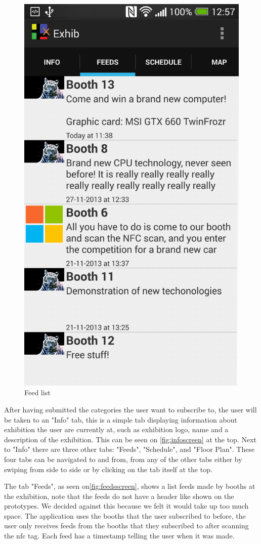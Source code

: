 \begin{figure}[H]
\begin{minipage}[b]{0.5\columnwidth}
\includegraphics[width=0.7\columnwidth]{img/finaldesign/feedsscreen.png}
\caption{Feed list} 
\label{fig:feedsscreen}
\end{minipage}
\end{figure}

After having submitted the categories the user want to subscribe to, the user will be taken to an "Info" tab, this is a simple tab displaying information about exhibition the user are currently at, such as exhibition logo, name and a description of the exhibition. This can be seen on \autoref{fig:infoscreen}  at the top. Next to "Info" there are three other tabs: "Feeds", "Schedule", and "Floor Plan". These four tabs can be navigated to and from, from any of the other tabs either by swiping from side to side or by clicking on the tab itself at the top.

The tab "Feeds", as seen on\autoref{fig:feedsscreen}, shows a list feeds made by booths at the exhibition, note that the feeds do not have a header like shown on the prototypes. We decided against this because we felt it would take up too much space. The application uses the booths that the user subscribed to before, the user only receives feeds from the booths that they subscribed to after scanning the \ac{nfc} tag. Each feed has a timestamp telling the user when it was made.

